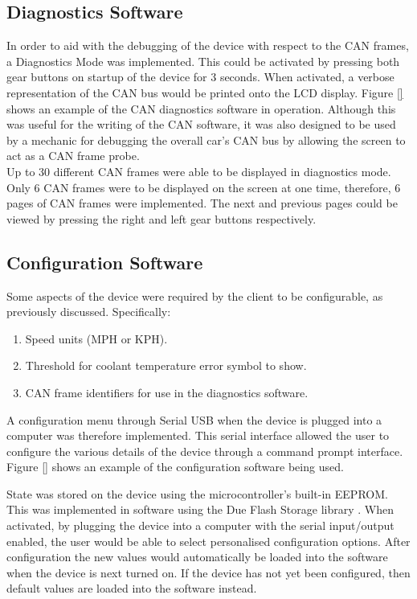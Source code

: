 \documentclass[a4paper,12pt]{article}
\begin{document}
\subsection{Diagnostics Software}
\label{sec:diagnostics_software}

In order to aid with the debugging of the device with respect to the CAN frames, a Diagnostics Mode was implemented. This could be activated by pressing both gear buttons on startup of the device for 3 seconds. When activated, a verbose representation of the CAN bus would be printed onto the LCD display. Figure \ref{} shows an example of the CAN diagnostics software in operation. Although this was useful for the writing of the CAN software, it was also designed to be used by a mechanic for debugging the overall car’s CAN bus by allowing the screen to act as a CAN frame probe. \\

Up to 30 different CAN frames were able to be displayed in diagnostics mode. Only 6 CAN frames were to be displayed on the screen at one time, therefore, 6 pages of CAN frames were implemented. The next and previous pages could be viewed by pressing the right and left gear buttons respectively.

\subsection{Configuration Software}
\label{sec:configuration_software}

Some aspects of the device were required by the client to be configurable, as previously discussed. Specifically:

\begin{enumerate}
  \item Speed units (MPH or KPH).
  \item Threshold for coolant temperature error symbol to show.
  \item CAN frame identifiers for use in the diagnostics software.
\end{enumerate}

A configuration menu through Serial USB when the device is plugged into a computer was therefore implemented. This serial interface allowed the user to configure the various details of the device through a command prompt interface. Figure \ref{} shows an example of the configuration software being used.

%

State was stored on the device using the microcontroller's built-in EEPROM. This was implemented in software using the Due Flash Storage library \cite{due_flash_storage}. When activated, by plugging the device into a computer with the serial input/output enabled, the user would be able to select personalised configuration options. After configuration the new values would automatically be loaded into the software when the device is next turned on. If the device has not yet been configured, then default values are loaded into the software instead.
\end{document}

